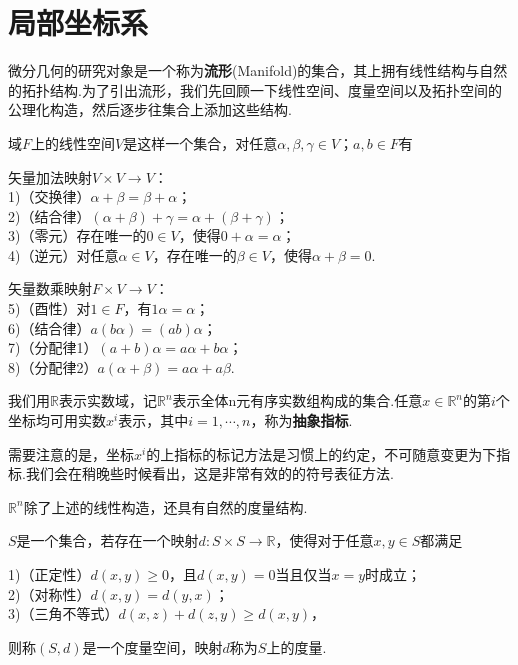 \section{局部坐标系}\label{sec:Coordinates}
微分几何的研究对象是一个称为\textbf{流形}(Manifold)的集合，其上拥有线性结构与自然的拓扑结构.为了引出流形，我们先回顾一下线性空间、度量空间以及拓扑空间的公理化构造，然后逐步往集合上添加这些结构.
	\begin{definition}
		域$F$上的线性空间$V$是这样一个集合，对任意$\alpha,\beta,\gamma\in V$；$a,b\in F$有

		矢量加法映射$V\times V\rightarrow V$：\\
		1)（交换律）$\alpha+\beta=\beta+\alpha$；\\
		2)（结合律）$(\alpha+\beta)+\gamma=\alpha+(\beta+\gamma)$；\\
		3)（零元）存在唯一的$0\in V$，使得$0+\alpha=\alpha$；\\
		4)（逆元）对任意$\alpha\in V$，存在唯一的$\beta\in V$，使得$\alpha+\beta=0$.
		
		矢量数乘映射$F\times V\rightarrow V$：\\
		5)（酉性）对$1\in F$，有$1\alpha=\alpha$；\\
		6)（结合律）$a(b\alpha)=(ab)\alpha$；\\
		7)（分配律1）$(a+b)\alpha=a\alpha+b\alpha$；\\
		8)（分配律2）$a(\alpha+\beta)=a\alpha+a\beta$.
	\end{definition}
	我们用$\mathbb{R}$表示实数域，记$\mathbb{R}^n$表示全体n元有序实数组构成的集合.任意$x\in\mathbb{R}^n$的第$i$个坐标均可用实数$x^i$表示，其中$i=1,\cdots,n$，称为\textbf{抽象指标}.
	\begin{remark}
		需要注意的是，坐标$x^i$的上指标的标记方法是习惯上的约定，不可随意变更为下指标.我们会在稍晚些时候看出，这是非常有效的的符号表征方法.
	\end{remark}
	$\mathbb{R}^n$除了上述的线性构造，还具有自然的度量结构.
	\begin{definition}
		$S$是一个集合，若存在一个映射$d:S\times S\rightarrow \mathbb{R}$，使得对于任意$x,y\in S$都满足

		1)（正定性）$d(x,y)\geqslant 0$，且$d(x,y)=0$当且仅当$x=y$时成立；\\
		2)（对称性）$d(x,y)=d(y,x)$；\\
		3)（三角不等式）$d(x,z)+d(z,y)\geqslant d(x,y)$，

		则称$(S,d)$是一个度量空间，映射$d$称为$S$上的度量.
	\end{definition}
